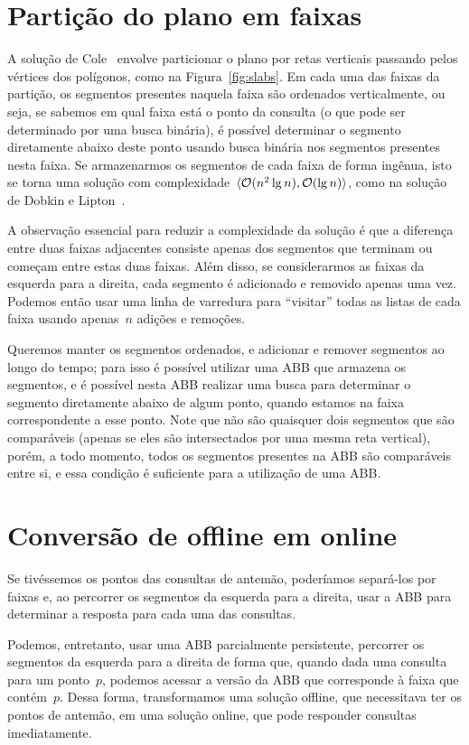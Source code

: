 \documentclass[main.tex]{subfiles}
\begin{document}
\section{Partição do plano em faixas}

A solução de Cole~\cite{Cole86} envolve particionar o plano por retas verticais passando pelos vértices dos polígonos, como na Figura~\ref{fig:slabs}. Em cada uma das faixas da partição, os segmentos presentes naquela faixa são ordenados verticalmente, ou seja, se sabemos em qual faixa está o ponto da consulta (o que pode ser determinado por uma busca binária), é possível determinar o segmento diretamente abaixo deste ponto usando busca binária nos segmentos presentes nesta faixa.
Se armazenarmos os segmentos de cada faixa de forma ingênua, isto se torna uma solução com complexidade~$\langle\mathcal{O}(n^2 \lg n), \mathcal{O}(\lg n)\rangle$, como na solução de Dobkin e Lipton~\cite{DobkinL76}.

A observação essencial para reduzir a complexidade da solução é que a diferença entre duas faixas adjacentes consiste apenas dos segmentos que terminam ou começam entre estas duas faixas. Além disso, se considerarmos as faixas da esquerda para a direita, cada segmento é adicionado e removido apenas uma vez. Podemos então usar uma linha de varredura para ``visitar'' todas as listas de cada faixa usando apenas~$n$ adições e remoções.

Queremos manter os segmentos ordenados, e adicionar e remover segmentos ao longo do tempo; para isso é possível utilizar uma ABB que armazena os segmentos, e é possível nesta ABB realizar uma busca para determinar o segmento diretamente abaixo de algum ponto, quando estamos na faixa correspondente a esse ponto. Note que não são quaisquer dois segmentos que são comparáveis (apenas se eles são intersectados por uma mesma reta vertical), porém, a todo momento, todos os segmentos presentes na ABB são comparáveis entre si, e essa condição é suficiente para a utilização de uma ABB.

\section{Conversão de offline em online}

Se tivéssemos os pontos das consultas de antemão, poderíamos separá-los por faixas e, ao percorrer os segmentos da esquerda para a direita, usar a ABB para determinar a resposta para cada uma das consultas.

Podemos, entretanto, usar uma ABB parcialmente persistente, percorrer os segmentos da esquerda para a direita de forma que, quando dada uma consulta para um ponto~$p$, podemos acessar a versão da ABB que corresponde à faixa que contém~$p$. Dessa forma, transformamos uma solução offline, que necessitava ter os pontos de antemão, em uma solução online, que pode responder consultas imediatamente.
\end{document}
